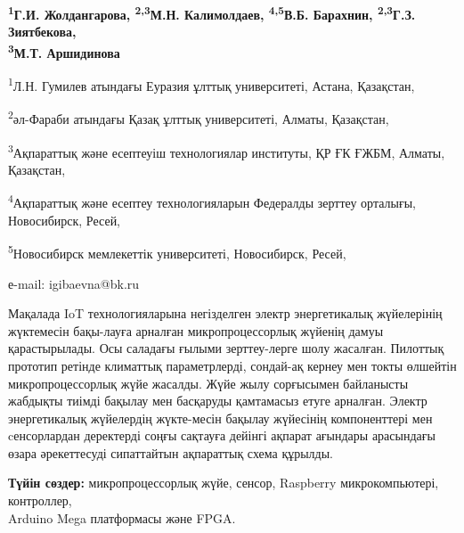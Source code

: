 \begin{center}
{\bfseries \textsuperscript{1}Г.И. Жолдангарова, \textsuperscript{2,3}М.Н.
Калимолдаев, \textsuperscript{4,5}В.Б. Барахнин,
\textsuperscript{2,3}Г.З. Зиятбекова\envelope,\\ \textsuperscript{3}М.Т. Аршидинова}

\textsuperscript{1}Л.Н. Гумилев атындағы Еуразия ұлттық университеті,
Астана, Қазақстан,

\textsuperscript{2}әл-Фараби атындағы Қазақ ұлттық университеті, Алматы,
Қазақстан,

\textsuperscript{3}Ақпараттық және есептеуіш технологиялар институты, ҚР
ҒК ҒЖБМ, Алматы, Қазақстан,

\textsuperscript{4}Ақпараттық және есептеу технологияларын Федералды
зерттеу орталығы, Новосибирск, Ресей,

\textsuperscript{5}Новосибирск мемлекеттік университеті, Новосибирск,
Ресей,

е-mail: igibaevna@bk.ru
\end{center}

Мақалада IoT технологияларына негізделген электр энергетикалық
жүйелерінің жүктемесін бақы-лауға арналған микропроцессорлық жүйенің
дамуы қарастырылады. Осы саладағы ғылыми зерттеу-лерге шолу жасалған.
Пилоттық прототип ретінде климаттық параметрлерді, сондай-ақ кернеу мен
токты өлшейтін микропроцессорлық жүйе жасалды. Жүйе жылу сорғысымен
байланысты жабдықты тиімді бақылау мен басқаруды қамтамасыз етуге
арналған. Электр энергетикалық жүйелердің жүкте-месін бақылау жүйесінің
компоненттері мен cенсорлардан деректерді соңғы сақтауға дейінгі ақпарат
ағындары арасындағы өзара әрекеттесуді сипаттайтын ақпараттық схема
құрылды.

{\bfseries Түйін сөздер:} микропроцессорлық жүйе, сенсор, Raspberry
микрокомпьютері, контроллер, \\Arduino Mega платформасы және FPGA.



